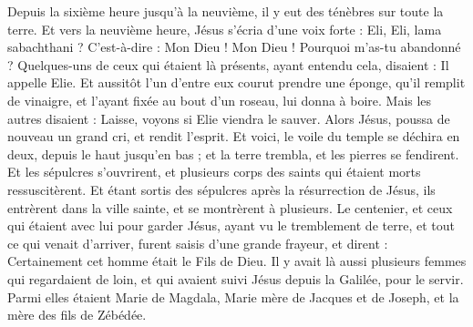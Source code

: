 \begin{multicols}{2}
Depuis la sixième heure jusqu’à la neuvième, il y eut des ténèbres sur toute la terre.
Et vers la neuvième heure, Jésus s'écria d’une voix forte : Eli, Eli, lama sabachthani ? C’est-à-dire : Mon Dieu ! Mon Dieu ! Pourquoi m'as-tu abandonné ?
Quelques-uns de ceux qui étaient là présents, ayant entendu cela, disaient : Il appelle Elie.
Et aussitôt l’un d'entre eux courut prendre une éponge, qu’il remplit de vinaigre, et l’ayant fixée au bout d'un roseau, lui donna à boire.
Mais les autres disaient : Laisse, voyons si Elie viendra le sauver.
Alors Jésus, poussa de nouveau un grand cri, et rendit l'esprit.
Et voici, le voile du temple se déchira en deux, depuis le haut jusqu'en bas{} ; et la terre trembla, et les pierres se fendirent.
Et les sépulcres s'ouvrirent, et plusieurs corps des saints qui étaient morts ressuscitèrent.
Et étant sortis des sépulcres après la résurrection de Jésus, ils entrèrent dans la ville sainte, et se montrèrent à plusieurs.
Le centenier, et ceux qui étaient avec lui pour garder Jésus, ayant vu le tremblement de terre, et tout ce qui venait d'arriver, furent saisis d’une grande frayeur, et dirent : Certainement cet homme était le Fils de Dieu.
Il y avait là aussi plusieurs femmes qui regardaient de loin, et qui avaient suivi Jésus depuis la Galilée, pour le servir.
Parmi elles étaient Marie de Magdala, Marie mère de Jacques et de Joseph, et la mère des fils de Zébédée.
\end{multicols}
